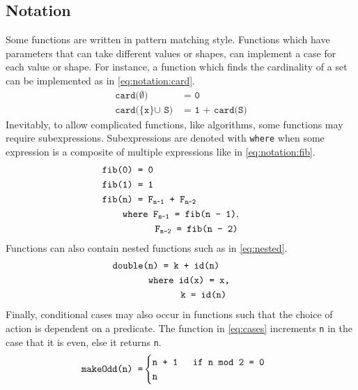 \subsection{Notation}
Some functions are written in pattern matching style.
Functions which have parameters that can take different values or shapes, can implement a case for each value or shape.
For instance, a function which finds the cardinality of a set can be implemented as in \autoref{eq:notation:card}.
\begin{align}
  \texttt{card($\emptyset$) }&\texttt{= 0} \label{eq:notation:card} \\
  \texttt{card(\{x\} $\cup$ S) }&\texttt{= 1 + card(S)} \tag*{}
\end{align}
Inevitably, to allow complicated functions, like algorithms, some functions may require subexpressions.
Subexpressions are denoted with \texttt{where} when some expression is a composite of multiple expressions like in \autoref{eq:notation:fib}.
\begin{align}
  \texttt{fib(0) }&\texttt{= 0} \label{eq:notation:fib} \\
  \texttt{fib(1) }&\texttt{= 1} \tag*{} \\
  \texttt{fib(n) }&\texttt{= F$_\texttt{n-1}$ + F$_\texttt{n-2}$} \tag*{} \\
  \texttt{whe}&\texttt{re F$_\texttt{n-1}$ = fib(n - 1)},\tag*{}\\
  &\hspace{0.62cm}\texttt{F$_\texttt{n-2}$ = fib(n - 2)}\tag*{}
\end{align}
Functions can also contain nested functions such as in \autoref{eq:nested}.
\begin{align}
  \texttt{double(n) }&\texttt{= k + id(n)} \label{eq:nested} \\
  \texttt{whe}&\texttt{re id(x) = x,} \tag*{}\\
  &\hspace{0.62cm}\texttt{k = id(n)} \tag*{}
\end{align}
Finally, conditional cases may also occur in functions such that the choice of action is dependent on a predicate.
The function in \autoref{eq:cases} increments \texttt{n} in the case that it is even, else it returns \texttt{n}.
\begin{align}
  \texttt{makeOdd(n) }&\texttt{=} 
  \begin{cases}
    \texttt{n + 1} & \texttt{ if n \texttt{mod} 2 = 0 }\\
    \texttt{n} & 
  \end{cases}\label{eq:cases} 
\end{align}
